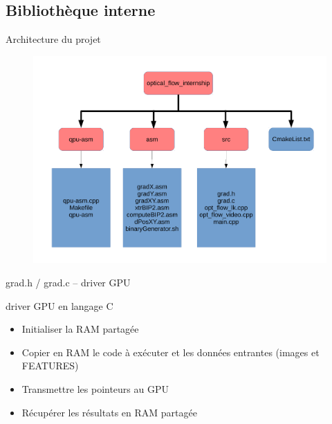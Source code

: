 \documentclass{bredelebeamer}
\begin{document}
\subsection{Bibliothèque interne}


\begin{frame}{Architecture du projet}

\begin{figure}
\centering
\includegraphics[scale=0.3]{images/optFlowArchitecture.pdf}
\end{figure}

\end{frame}


\begin{frame}{grad.h / grad.c -- driver GPU}

\begin{block}{driver GPU en langage C}
\begin{itemize}
\item Initialiser la RAM partagée
\item Copier en RAM le code à exécuter et les données entrantes (images et FEATURES)
\item Transmettre les pointeurs au GPU
\item Récupérer les résultats en RAM partagée
\end{itemize}
\end{block}

\end{frame}
\end{document}
